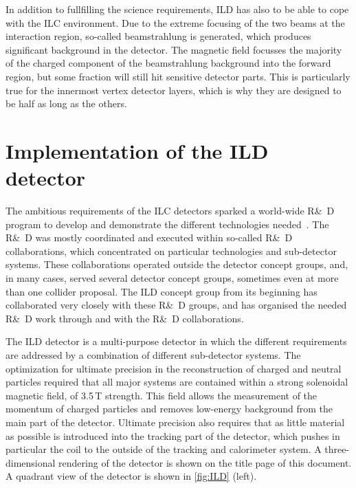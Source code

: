 \documentclass[%
 amsmath,amssymb,
 aps,
 longbibliography,
]{revtex4-1}
\begin{document}
In addition to fullfilling the science requirements, ILD has also to be able to cope with the ILC environment. Due to the extreme focusing of the two beams at the interaction region, so-called beamstrahlung is generated, which produces significant background in the detector. The magnetic field focusses the majority of the charged component of the beamstrahlung background into the forward region, but some fraction will still hit sensitive detector parts. This is particularly true for the innermost vertex detector layers, which is why they are designed to be half as long as the others.



\section{Implementation of the ILD detector}
The ambitious requirements of the ILC detectors sparked a world-wide {R\&~D} program to develop and demonstrate the different technologies needed~\cite{RDliaision}. The {R\&~D} was mostly coordinated and executed within so-called {R\&~D} collaborations, which concentrated on particular technologies and sub-detector systems. These collaborations operated outside the detector concept groups, and, in many cases, served several detector concept groups, sometimes even at more than one collider proposal. The ILD concept group from its beginning has collaborated very closely with these {R\&~D} groups, and has organised the needed {R\&~D} work through and with the {R\&~D} collaborations. 

The ILD detector is a multi-purpose detector in which the different requirements are addressed by a combination of different sub-detector systems. The optimization for ultimate precision in the reconstruction of charged and neutral particles required that all major systems are contained within a strong solenoidal magnetic field, of 3.5\,T strength. This field allows the measurement of the momentum of charged particles and removes low-energy background from the main part of the detector. Ultimate precision also requires that as little material as possible is introduced into the tracking part of the detector, which pushes in particular the coil to the outside of the tracking and calorimeter system. A three-dimensional rendering of the detector is shown on the title page of this document.
A quadrant view of the detector is shown in \ref{fig:ILD} (left).
\end{document}

